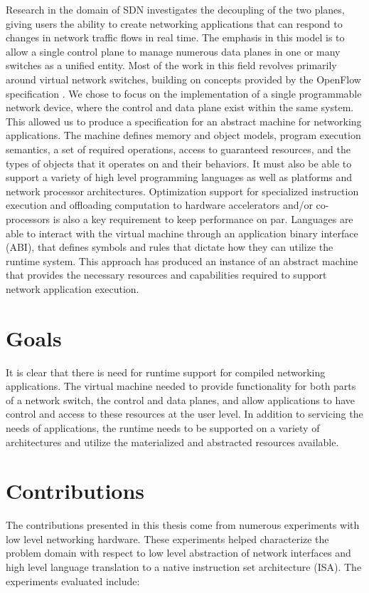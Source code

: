 Research in the domain of SDN investigates the
decoupling of the two planes, giving users the ability to create networking
applications that can respond to changes in network traffic flows in real time.
The emphasis in this model is to allow a single control plane to manage
numerous data planes in one or many switches as a unified entity. Most of the
work in this field revolves primarily around virtual network switches,
building on concepts provided by the OpenFlow specification \cite{openflow}.
We chose to focus on the implementation of a single programmable network
device, where the control and data plane exist within the same system. This
allowed us to produce a specification for an abstract machine for networking
applications. The machine defines memory and object models, program execution
semantics, a set of required operations, access to guaranteed resources, and
the types of objects that it operates on and their behaviors. It must also be
able to support a variety of high level programming languages as well as
platforms and network processor architectures. Optimization support for
specialized instruction execution and offloading computation to hardware
accelerators and/or co-processors is also a key requirement to keep
performance on par. Languages are able to interact with the virtual machine
through an application binary interface (ABI), that defines symbols and rules
that dictate how they can utilize the runtime system. This approach has
produced an instance of an abstract machine that provides the necessary
resources and capabilities required to support network application execution.


\section{Goals}
\label{intro:goals}
It is clear that there is need for runtime support for compiled
networking applications. The virtual machine needed to provide functionality
for both parts of a network switch, the control and data planes, and allow
applications to have control and access to these resources at the user level.
In addition to servicing the needs of applications, the runtime needs to be
supported on a variety of architectures and utilize the materialized and
abstracted resources available.

\section{Contributions}
\label{intro:contrib}
The contributions presented in this thesis come from numerous experiments with
low level networking hardware. These experiments helped characterize the
problem domain with respect to low level abstraction of network interfaces and
high level language translation to a native instruction set architecture
(ISA). The experiments evaluated include:

